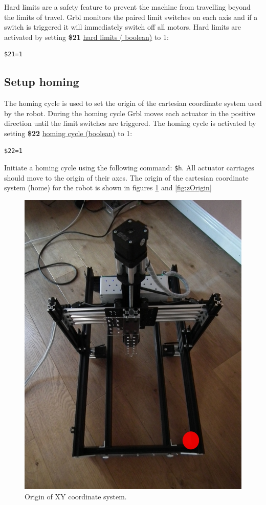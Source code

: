 \documentclass[]{book}
\theoremstyle{definition}
\theoremstyle{definition}
\theoremstyle{remark}
\begin{document}
Hard limits are a safety feature to prevent the machine from travelling
beyond the limits of travel. Grbl monitors the paired limit switches on
each axis and if a switch is triggered it will immediately switch off
all motors. Hard limits are activated by setting \textbf{\$21}
\href{https://github.com/gnea/grbl/wiki/Grbl-v1.1-Configuration\#21---hard-limits-boolean}{hard
limits ( boolean)} to 1:

\begin{verbatim}
$21=1
\end{verbatim}

\subsection{Setup homing}\label{setup-homing}

The homing cycle is used to set the origin of the cartesian coordinate
system used by the robot. During the homing cycle Grbl moves each
actuator in the positive direction until the limit switches are
triggered. The homing cycle is activated by setting \textbf{\$22}
\href{https://github.com/gnea/grbl/wiki/Grbl-v1.1-Configuration\#22---homing-cycle-boolean}{homing
cycle (boolean)} to 1:

\begin{verbatim}
$22=1
\end{verbatim}

Initiate a homing cycle using the following command: \texttt{\$h}. All
actuator carriages should move to the origin of their axes. The origin
of the cartesian coordinate system (home) for the robot is shown in
figures \ref{fig:xyOrigin} and \ref{fig:zOrigin}

\begin{figure}

{\centering \includegraphics[width=0.75\linewidth]{images/xy_origin} 

}

\caption{Origin of XY coordinate system.}\label{fig:xyOrigin}
\end{figure}
\end{document}

